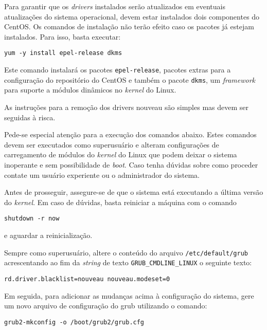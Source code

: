 \documentclass[twoside,a4paper,12pt,english]{inac17}
\begin{document}
Para garantir que os \textit{drivers} instalados serão atualizados em eventuais 
atualizações do sistema operacional, devem estar instalados dois componentes do 
CentOS. Os comandos de instalação não terão efeito caso os pacotes já estejam 
instalados. Para isso, basta executar:

\texttt{yum -y install epel-release dkms}

Este comando instalará os pacotes \texttt{epel-release}, pacotes extras para 
a configuração do repositório do CentOS e também o pacote \texttt{dkms}, um 
\textit{framework} para suporte a módulos dinâmicos no \textit{kernel} do Linux.

As instruções para a remoção dos drivers nouveau são simples mas devem ser seguidas 
à risca.

\begin{shadedbox}
Pede-se especial atenção para a execução dos comandos abaixo. Estes comandos devem 
ser executados como superusuário e alteram configurações de carregamento de módulos 
do \textit{kernel} do Linux que podem deixar o sistema inoperante e sem possibilidade 
de \textit{boot}. Caso tenha dúvidas sobre como proceder contate um usuário 
experiente ou o administrador do sistema.
\end{shadedbox}

Antes de prosseguir, assegure-se de que o sistema está executando a última versão 
do \textit{kernel}. Em caso de dúvidas, basta reiniciar a máquina com o comando 

\texttt{shutdown -r now}

e aguardar a reinicialização.

Sempre como superusuário, altere o conteúdo do arquivo \texttt{/etc/default/grub} 
acrescentando ao fim da \textit{string} de texto \texttt{GRUB\_CMDLINE\_LINUX} 
o seguinte texto:

\texttt{rd.driver.blacklist=nouveau nouveau.modeset=0}


Em seguida, para adicionar as mudanças acima à configuração do sistema, gere um novo arquivo de configuração do grub utilizando o comando:

\texttt{grub2-mkconfig -o /boot/grub2/grub.cfg}
\end{document}
